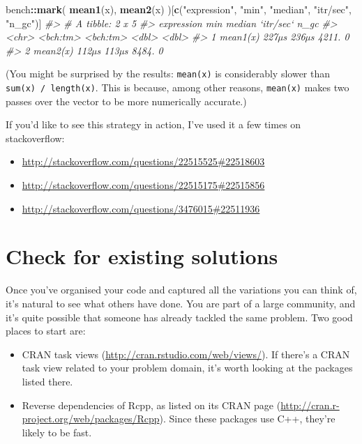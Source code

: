 \documentclass[]{book}
\newenvironment{Shaded}{\begin{snugshade}}{\end{snugshade}}
\newcommand{\CommentTok}[1]{\textcolor[rgb]{0.37,0.37,0.37}{\textit{#1}}}
\newcommand{\KeywordTok}[1]{\textcolor[rgb]{0.27,0.27,0.27}{\textbf{#1}}}
\newcommand{\NormalTok}[1]{#1}
\newcommand{\OperatorTok}[1]{\textcolor[rgb]{0.43,0.43,0.43}{\textbf{#1}}}
\newcommand{\StringTok}[1]{\textcolor[rgb]{0.5,0.5,0.5}{#1}}
\providecommand{\tightlist}{%
  \setlength{\itemsep}{0pt}\setlength{\parskip}{0pt}}
\renewcommand{\href}[2]{#2 (\url{#1})}
\begin{document}
\begin{Shaded}
\begin{Highlighting}[]
\NormalTok{bench}\OperatorTok{::}\KeywordTok{mark}\NormalTok{(}
  \KeywordTok{mean1}\NormalTok{(x),}
  \KeywordTok{mean2}\NormalTok{(x)}
\NormalTok{)[}\KeywordTok{c}\NormalTok{(}\StringTok{"expression"}\NormalTok{, }\StringTok{"min"}\NormalTok{, }\StringTok{"median"}\NormalTok{, }\StringTok{"itr/sec"}\NormalTok{, }\StringTok{"n_gc"}\NormalTok{)]}
\CommentTok{#> # A tibble: 2 x 5}
\CommentTok{#>   expression      min   median `itr/sec`  n_gc}
\CommentTok{#>   <chr>      <bch:tm> <bch:tm>     <dbl> <dbl>}
\CommentTok{#> 1 mean1(x)      227µs    236µs     4211.     0}
\CommentTok{#> 2 mean2(x)      112µs    113µs     8484.     0}
\end{Highlighting}
\end{Shaded}

(You might be surprised by the results: \texttt{mean(x)} is considerably slower than \texttt{sum(x)\ /\ length(x)}. This is because, among other reasons, \texttt{mean(x)} makes two passes over the vector to be more numerically accurate.)

If you'd like to see this strategy in action, I've used it a few times on stackoverflow:

\begin{itemize}
\tightlist
\item
  \url{http://stackoverflow.com/questions/22515525\#22518603}
\item
  \url{http://stackoverflow.com/questions/22515175\#22515856}
\item
  \url{http://stackoverflow.com/questions/3476015\#22511936}
\end{itemize}

\hypertarget{already-solved}{%
\section{Check for existing solutions}\label{already-solved}}

Once you've organised your code and captured all the variations you can think of, it's natural to see what others have done. You are part of a large community, and it's quite possible that someone has already tackled the same problem. Two good places to start are:

\begin{itemize}
\item
  \href{http://cran.rstudio.com/web/views/}{CRAN task views}. If there's a
  CRAN task view related to your problem domain, it's worth looking at
  the packages listed there.
\item
  Reverse dependencies of Rcpp, as listed on its
  \href{http://cran.r-project.org/web/packages/Rcpp}{CRAN page}. Since these
  packages use C++, they're likely to be fast.
\end{itemize}
\end{document}
